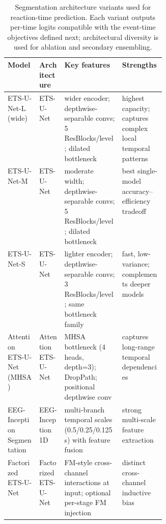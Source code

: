
\begin{table}[t!]
\caption{Segmentation architecture variants used for reaction-time prediction. Each variant outputs per-time logits compatible with the event-time objectives defined next; architectural diversity is used for ablation and secondary ensembling.}
\label{tab:rt_seg_models}
\small
\centering
\renewcommand{\arraystretch}{1.2}
\setlength{\tabcolsep}{4pt} %

\begin{tabularx}{\linewidth}{@{}
  >{\RaggedRight\arraybackslash}p{0.20\linewidth}
  >{\RaggedRight\arraybackslash}p{0.16\linewidth}
  >{\RaggedRight\arraybackslash}X
  >{\RaggedRight\arraybackslash}X
@{}}
\hline
\textbf{Model} & \textbf{Architecture} & \textbf{Key features} & \textbf{Strengths} \\
\hline

ETS-U-Net-L (wide)
& ETS-U-Net
& wider encoder; depthwise-separable convs; 5 ResBlocks/level; dilated bottleneck
& highest capacity; captures complex local temporal patterns \\

ETS-U-Net-M
& ETS-U-Net
& moderate width; depthwise-separable convs; 5 ResBlocks/level; dilated bottleneck
& best single-model accuracy--efficiency tradeoff \\

ETS-U-Net-S
& ETS-U-Net
& lighter encoder; depthwise-separable convs; 3 ResBlocks/level; same bottleneck family
& fast, low-variance; complements deeper models \\

Attention ETS-U-Net (MHSA)
& Attention ETS-U-Net
& MHSA bottleneck (4 heads, depth=3); DropPath; positional depthwise conv
& captures long-range temporal dependencies \\

EEG-Inception Segmentation
& EEG-Inception 1D
& multi-branch temporal scales (0.5/0.25/0.125\,s) with feature fusion
& strong multi-scale feature extraction \\

Factorized ETS-U-Net
& Factorized ETS-U-Net
& FM-style cross-channel interactions at input; optional per-stage FM injection
& distinct cross-channel inductive bias \\
\hline
\end{tabularx}
\end{table}
